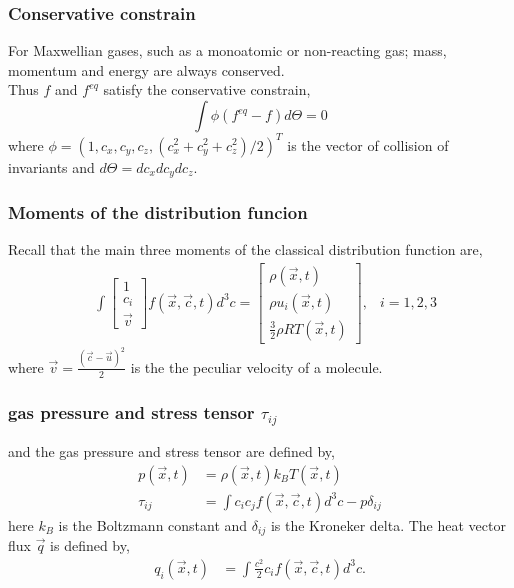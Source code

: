 \begin{frame}
	\frametitle{Conservative constrain}
	For Maxwellian gases, such as a monoatomic or non-reacting gas; mass, momentum and energy are always conserved. \\ 
	Thus $f$ and $f^{eq}$ satisfy the conservative constrain,
		\begin{equation}
			\int \phi (f^{eq}-f) d\Theta = 0
		\end{equation}
		where $\phi = (1, c_x, c_y, c_z, (c^2_x+c^2_y+c^2_z)/2)^T$ is the vector of collision of invariants and $d\Theta = dc_x dc_y dc_z$.
\end{frame}

\begin{frame}
	\frametitle{Moments of the distribution funcion}
	Recall that the main three moments of the classical distribution function are,
	\begin{align*}
		&\int{
		\begin{bmatrix}
			1 			\\
			c_i 		\\
			\vec{v}
		\end{bmatrix}
		} f(\vec{x},\vec{c},t)d^3c = 
		\begin{bmatrix}
			\rho(\vec{x},t)		\\
			\rho u_i(\vec{x},t)	\\
			\frac{3}{2}\rho RT(\vec{x},t)
		\end{bmatrix}, & i = 1,2,3
	\end{align*}
	where $\vec{v} = \frac{(\vec{c}-\vec{u})^2}{2}$ is the the peculiar velocity of a molecule.
\end{frame}

\begin{frame}
	\frametitle{gas pressure and stress tensor $\tau_{ij}$}
		and the gas pressure and stress tensor are defined by,
		\begin{align*}
			p(\vec{x},t) &= \rho(\vec{x},t) k_B T(\vec{x},t) \\
			\tau_{ij} &= \int c_i c_j f(\vec{x},\vec{c},t) d^3c - p\delta_{ij}
		\end{align*}
		here $k_B$ is the Boltzmann constant and $\delta_{ij}$ is the Kroneker delta.
		The heat vector flux $\vec{q}$ is defined by,
		\begin{align*}
			q_i (\vec{x},t) &= \int \frac{c^2}{2} c_i f(\vec{x},\vec{c},t)d^3c.
		\end{align*}
\end{frame}

